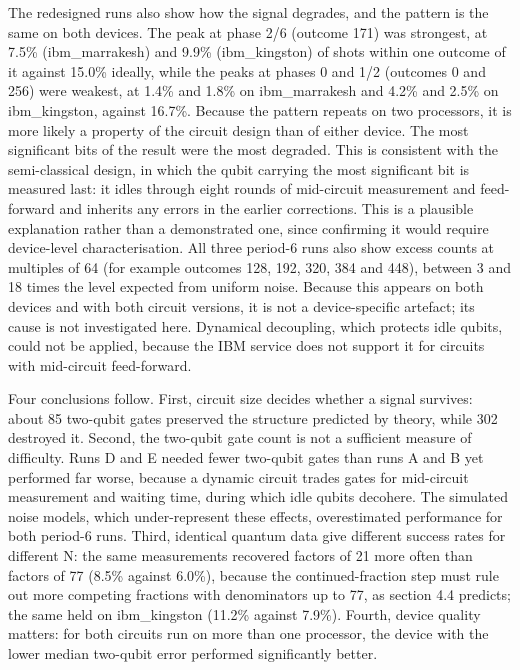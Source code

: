 \documentclass[12pt,oneside]{report}
\begin{document}
The redesigned runs also show how the signal degrades, and the pattern is the same on both devices. The peak at phase 2/6 (outcome 171) was strongest, at 7.5\% (ibm\_marrakesh) and 9.9\% (ibm\_kingston) of shots within one outcome of it against 15.0\% ideally, while the peaks at phases 0 and 1/2 (outcomes 0 and 256) were weakest, at 1.4\% and 1.8\% on ibm\_marrakesh and 4.2\% and 2.5\% on ibm\_kingston, against 16.7\%. Because the pattern repeats on two processors, it is more likely a property of the circuit design than of either device. The most significant bits of the result were the most degraded. This is consistent with the semi-classical design, in which the qubit carrying the most significant bit is measured last: it idles through eight rounds of mid-circuit measurement and feed-forward and inherits any errors in the earlier corrections. This is a plausible explanation rather than a demonstrated one, since confirming it would require device-level characterisation. All three period-6 runs also show excess counts at multiples of 64 (for example outcomes 128, 192, 320, 384 and 448), between 3 and 18 times the level expected from uniform noise. Because this appears on both devices and with both circuit versions, it is not a device-specific artefact; its cause is not investigated here. Dynamical decoupling, which protects idle qubits, could not be applied, because the IBM service does not support it for circuits with mid-circuit feed-forward.
\par

Four conclusions follow. First, circuit size decides whether a signal survives: about 85 two-qubit gates preserved the structure predicted by theory, while 302 destroyed it. Second, the two-qubit gate count is not a sufficient measure of difficulty. Runs D and E needed fewer two-qubit gates than runs A and B yet performed far worse, because a dynamic circuit trades gates for mid-circuit measurement and waiting time, during which idle qubits decohere. The simulated noise models, which under-represent these effects, overestimated performance for both period-6 runs. Third, identical quantum data give different success rates for different N: the same measurements recovered factors of 21 more often than factors of 77 (8.5\% against 6.0\%), because the continued-fraction step must rule out more competing fractions with denominators up to 77, as section 4.4 predicts; the same held on ibm\_kingston (11.2\% against 7.9\%). Fourth, device quality matters: for both circuits run on more than one processor, the device with the lower median two-qubit error performed significantly better.
\par
\end{document}
